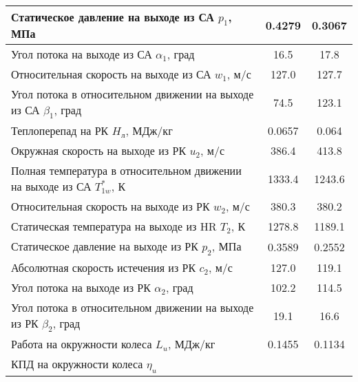 \documentclass[a4paper,10pt]{article}
\begin{document}
\begin{longtable}{
    |p{8cm}|
%    
    c|
%    
    c|
%    
    }
%        
        \\ \hline
        Статическое давление на выходе из СА $p_1$, МПа
%        
        & 0.4279
%        
        & 0.3067
%        
        \\ \hline
        Угол потока на выходе из СА $\alpha_1$, град
%        
        & 16.5
%        
        & 17.8
%        
        \\ \hline
        Относительная скорость на выходе из СА $w_1$, м/с
%        
        & 127.0
%        
        & 127.7
%        
        \\ \hline
        Угол потока в относительном движении на выходе из СА $\beta_1$, град
%        
        & 74.5
%        
        & 123.1
%        
        \\ \hline
        Теплоперепад на РК $H_л$, МДж/кг
%        
        & 0.0657
%        
        & 0.064
%        
        \\ \hline
        Окружная скорость на выходе из РК $u_2$, м/с
%        
        & 386.4
%        
        & 413.8
%        
        \\ \hline
        Полная температура в относительном движении на выходе из СА $T_{1w}^*$, К
%        
        & 1333.4
%        
        & 1243.6
%        
        \\ \hline
        Относительная скорость на выходе из РК $w_2$, м/с
%        
        & 380.3
%        
        & 380.2
%        
        \\ \hline
        Статическая температура на выходе из HR $T_2$, К
%        
        & 1278.8
%        
        & 1189.1
%        
        \\ \hline
        Статическое давление на выходе из РК $p_2$, МПа
%        
        & 0.3589
%        
        & 0.2552
%        
        \\ \hline
        Абсолютная скорость истечения из РК $c_2$, м/с
%        
        & 127.0
%        
        & 119.1
%        
        \\ \hline
        Угол потока на выходе из РК $\alpha_2$, град
%        
        & 102.2
%        
        & 114.5
%        
        \\ \hline
        Угол потока в относительном движении на выходе из РК $\beta_2$, град
%        
        & 19.1
%        
        & 16.6
%        
        \\ \hline
        Работа на окружности колеса $L_u$, МДж/кг
%        
        & 0.1455
%        
        & 0.1134
%        
        \\ \hline
        КПД на окружности колеса $\eta_u$

\end{longtable}
\end{document}
